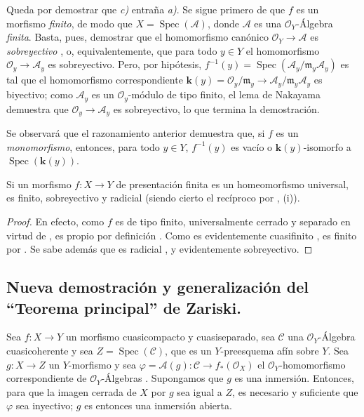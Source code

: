 Queda por demostrar que \emph{c)} entraña \emph{a)}.
Se sigue primero de  que $f$ es un morfismo \emph{finito}, de modo que $X=\operatorname{Spec}(\mathcal A)$, donde $\mathcal A$ es una $\mathcal O_Y$-Álgebra \emph{finita}.
Basta, pues, demostrar que el homomorfismo canónico $\mathcal O_Y\to\mathcal A$ es \emph{sobreyectivo} , o, equivalentemente, que para todo $y\in Y$ el homomorfismo $\mathcal O_y\to\mathcal A_y$ es sobreyectivo.
Pero, por hipótesis,
$f^{-1}(y)=\operatorname{Spec}(\mathcal A_y/\mathfrak m_y\mathcal A_y)$  es tal que el homomorfismo correspondiente $\boldsymbol{k}(y)=\mathcal O_y/\mathfrak m_y\to
\mathcal A_y/\mathfrak m_y\mathcal A_y$ es biyectivo; como $\mathcal A_y$ es un $\mathcal O_y$-módulo de tipo finito, el lema de Nakayama demuestra que $\mathcal O_y\to\mathcal A_y$ es sobreyectivo, lo que termina la demostración.

\begin{remark}[8.11.5.1]
\label{IV.8.11.5.1-fr}
Se observará que el razonamiento anterior demuestra que, si $f$ es un \emph{monomorfismo}, entonces, para todo $y\in Y$, $f^{-1}(y)$ es vacío o $\boldsymbol{k}(y)$-isomorfo a $\operatorname{Spec}(\boldsymbol{k}(y))$.
\end{remark}

\begin{proposition}[8.11.6]
\label{IV.8.11.6-fr}
Si un morfismo $f:X\to Y$ de presentación finita es un homeomorfismo universal, es finito, sobreyectivo y radicial \textup{(siendo cierto el recíproco por , (i))}.
\end{proposition}

\begin{proof}
En efecto, como $f$ es de tipo finito, universalmente cerrado y separado en virtud de , es propio por definición .
Como es evidentemente cuasifinito , es finito por .
Se sabe además que es radicial , y evidentemente sobreyectivo.
\end{proof}

\subsection{Nueva demostración y generalización del ``Teorema principal'' de Zariski.}
\label{subsection:IV.8.12-fr}
\label{IV.8.12-fr}

\begin{lemma}[8.12.1]
\label{IV.8.12.1-fr}
Sea $f:X\to Y$ un morfismo cuasicompacto y cuasiseparado, sea $\mathcal C$ una $\mathcal O_Y$-Álgebra cuasicoherente y sea $Z=\operatorname{Spec}(\mathcal C)$, que es un $Y$-preesquema afín sobre $Y$.
Sea $g:X\to Z$ un $Y$-morfismo y sea $\varphi=\mathcal A(g):\mathcal C\to f_*(\mathcal O_X)$ el $\mathcal O_Y$-homomorfismo correspondiente de $\mathcal O_Y$-Álgebras .
Supongamos que $g$ es una inmersión.
Entonces, para que la imagen cerrada de $X$ por $g$  sea igual a $Z$, es necesario y suficiente que $\varphi$ sea inyectivo; $g$ es entonces una inmersión abierta.
\end{lemma}

